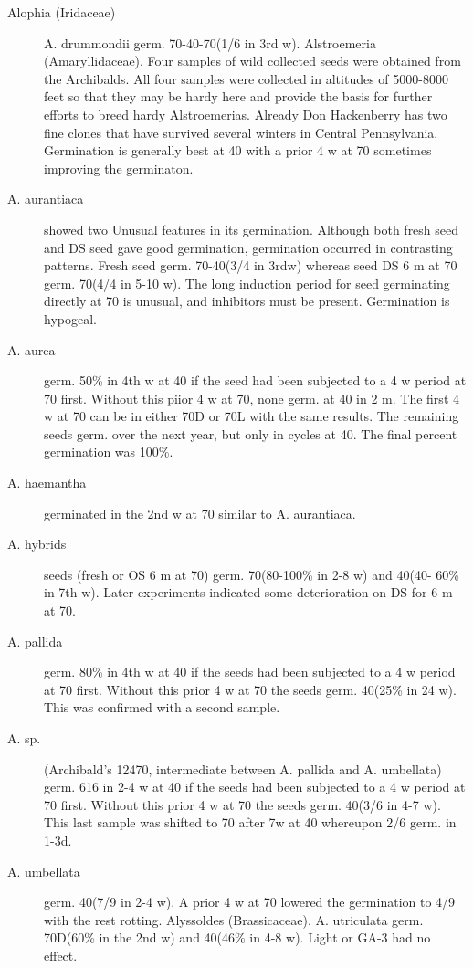 \begin{description}
\item[Alophia (Iridaceae)] A. drummondii germ. 70-40-70(1/6 in 3rd w).
Alstroemeria (Amaryllidaceae). Four samples of wild collected seeds
were obtained from the Archibalds. All four samples were collected in altitudes of
5000-8000 feet so that they may be hardy here and provide the basis for further efforts
to breed hardy Alstroemerias. Already Don Hackenberry has two fine clones that have
survived several winters in Central Pennsylvania. Germination is generally best at 40
with a prior 4 w at 70 sometimes improving the germinaton.
\item[A. aurantiaca] showed two Unusual features in its germination. Although both
fresh seed and DS seed gave good germination, germination occurred in contrasting
patterns. Fresh seed germ. 70-40(3/4 in 3rdw) whereas seed DS 6 m at 70 germ.
70(4/4 in 5-10 w). The long induction period for seed germinating directly at 70 is
unusual, and inhibitors must be present. Germination is hypogeal.
\item[A. aurea] germ. 50\% in 4th w at 40 if the seed had been subjected to a 4 w
period at 70 first. Without this piior 4 w at 70, none germ. at 40 in 2 m. The first 4 w at
70 can be in either 70D or 70L with the same results. The remaining seeds germ. over
the next year, but only in cycles at 40. The final percent germination was 100\%.
\item[A. haemantha] germinated in the 2nd w at 70 similar to A. aurantiaca.
\item[A. hybrids] seeds (fresh or OS 6 m at 70) germ. 70(80-100\% in 2-8 w) and 40(40-
60\% in 7th w). Later experiments indicated some deterioration on DS for 6 m at 70.
\item[A. pallida] germ. 80\% in 4th w at 40 if the seeds had been subjected to a 4 w
period at 70 first. Without this prior 4 w at 70 the seeds germ. 40(25\% in 24 w). This
was confirmed with a second sample.
\item[A. sp.] (Archibald's 12470, intermediate between A. pallida and A. umbellata)
germ. 616 in 2-4 w at 40 if the seeds had been subjected to a 4 w period at 70 first.
Without this prior 4 w at 70 the seeds germ. 40(3/6 in 4-7 w). This last sample was
shifted to 70 after 7w at 40 whereupon 2/6 germ. in 1-3d.
\item[A. umbellata] germ. 40(7/9 in 2-4 w). A prior 4 w at 70 lowered the germination
to 4/9 with the rest rotting.
Alyssoldes (Brassicaceae). A. utriculata germ. 70D(60\% in the 2nd w) and
40(46\% in 4-8 w). Light or GA-3 had no effect.


\end{description}
